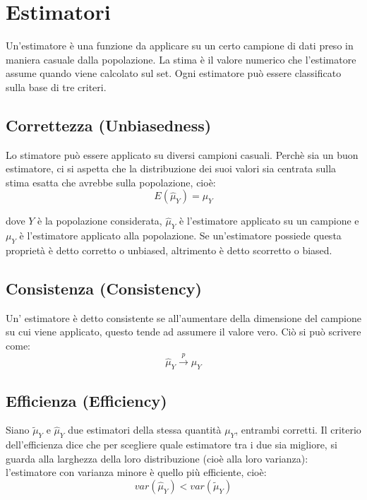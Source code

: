 \section{Estimatori}

Un'estimatore è una funzione da applicare su un certo campione di dati preso in maniera casuale dalla popolazione. La stima è il valore numerico che l'estimatore assume quando viene calcolato sul set. Ogni estimatore può essere classificato sulla base di tre criteri.

\subsection{Correttezza (Unbiasedness)}
Lo stimatore può essere applicato su diversi campioni casuali. Perchè sia un buon estimatore, ci si aspetta che la distribuzione dei suoi valori sia centrata sulla stima esatta che avrebbe sulla popolazione, cioè:
\begin{equation}
E(\hat{\mu}_Y) = \mu_Y
\end{equation}

dove $Y$ è la popolazione considerata, $\hat{\mu}_Y$ è l'estimatore applicato su un campione e $\mu_Y$ è l'estimatore applicato alla popolazione. Se un'estimatore possiede questa proprietà è detto corretto o unbiased, altrimento è detto scorretto o biased.

\subsection{Consistenza (Consistency)}
Un' estimatore è detto consistente se all'aumentare della dimensione del campione su cui viene applicato, questo tende ad assumere il valore vero. Ciò si può scrivere come:
\begin{equation}
\hat{\mu}_Y \xrightarrow{p} \mu_Y
\end{equation}

\subsection{Efficienza (Efficiency)}
Siano $\tilde{\mu}_Y$ e $\hat{\mu}_Y$ due estimatori della stessa quantità $\mu_Y$, entrambi corretti. Il criterio dell'efficienza dice che per scegliere quale estimatore tra i due sia migliore, si guarda alla larghezza della loro distribuzione (cioè alla loro varianza): l'estimatore con varianza minore è quello più efficiente, cioè:
\begin{equation}
var(\hat{\mu}_Y) < var(\tilde{\mu}_Y)
\end{equation}
